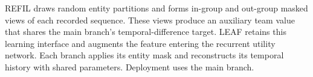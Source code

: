 REFIL draws random entity partitions and forms in-group and out-group masked views of each recorded sequence. These views produce an auxiliary team value that shares the main branch's temporal-difference target. LEAF retains this learning interface and augments the feature entering the recurrent utility network. Each branch applies its entity mask and reconstructs its temporal history with shared parameters. Deployment uses the main branch.
